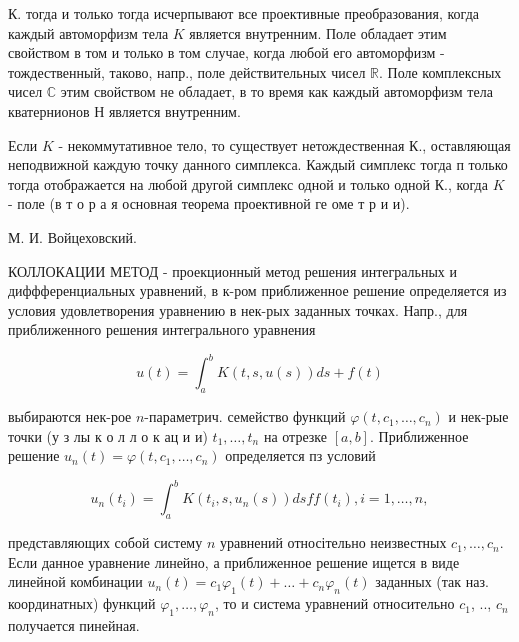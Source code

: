 \documentclass[10pt]{article}
\begin{document}
К. тогда и только тогда исчерпывают все проективные преобразования, когда каждый автоморфизм тела $K$ является внутренним. Поле обладает этим свойством в том и только в том случае, когда любой его автоморфизм - тождественный, таково, напр., поле действительных чисел $\mathbb{R}$. Поле комплексных чисел $\mathbb{C}$ этим свойством не обладает, в то время как каждый автоморфизм тела кватернионов Н является внутренним.



Если $K$ - некоммутативное тело, то существует нетождественная К., оставляющая неподвижной каждую точку данного симплекса. Каждый симплекс тогда п только тогда отображается на любой другой симплекс одной и только одной К., когда $K$ - поле (в т о р а я основная теорема проективной ге оме т р и и).



М. И. Войцеховский.



КОЛЛОКАЦИИ МЕТОД - проекционный метод решения интегральных и диффференциальных уравнений, в к-ром приближенное решение определяется из условия удовлетворения уравнению в нек-рых заданных точках. Напр., для приближенного решения интегрального уравнения



\[

u(t)=\int_{a}^{b} K(t, s, u(s)) d s+f(t)

\]



выбираются нек-рое $n$-параметрич. семейство функций $\varphi\left(t, c_{1}, \ldots, c_{n}\right)$ и нек-рые точки (у з лы к о л л о к ац и и) $t_{1}, \ldots, t_{n}$ на отрезке $[a, b]$. Приближенное решение $u_{n}(t)=\varphi\left(t, c_{1}, \ldots, c_{n}\right)$ определяется пз условий



\[

u_{n}\left(t_{i}\right)=\int_{a}^{b} K\left(t_{i}, s, u_{n}(s)\right) d s f f\left(t_{i}\right), i=1, \ldots, n,

\]



представляющих собой систему $n$ уравнений относітельно неизвестных $c_{1}, \ldots, c_{n}$. Если данное уравнение линейно, а приближенное решение ищется в виде линейной комбинации $u_{n}(t)=c_{1} \varphi_{1}(t)+\ldots+c_{n} \varphi_{n}(t)$ заданных (так наз. координатных) функций $\varphi_{1}, \ldots, \varphi_{n}$, то и система уравнений относительно $c_{1}$, .., $c_{n}$ получается пинейная.
\end{document}
